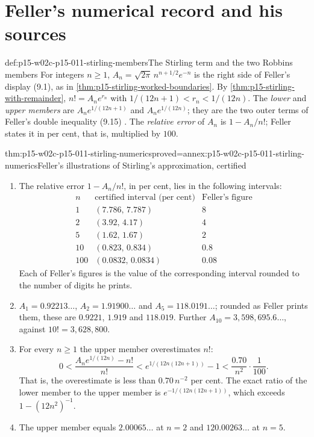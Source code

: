 \section{Feller's numerical record and his sources}
\label{sec:p15-w02c-p15-011-feller-record}

\begin{hbconvention}{def:p15-w02c-p15-011-stirling-members}{The Stirling term and the two Robbins members}
For integers \(n\geq1\), \(A_n=\sqrt{2\pi}\,n^{n+1/2}e^{-n}\) is the right
side of Feller's display (9.1), as in
\cref{thm:p15-stirling-worked-boundaries}. By
\cref{thm:p15-stirling-with-remainder}, \(n!=A_ne^{r_n}\) with
\(1/(12n+1)<r_n<1/(12n)\). The \emph{lower} and \emph{upper members} are
\(A_ne^{1/(12n+1)}\) and \(A_ne^{1/(12n)}\); they are the two outer terms of
Feller's double inequality (9.15)
\cite[p.~54]{Feller1968ProbabilityI}. The \emph{relative error} of \(A_n\) is
\(1-A_n/n!\); Feller states it in per cent, that is, multiplied by \(100\).
\end{hbconvention}

\begin{hbtheorem}{thm:p15-w02c-p15-011-stirling-numerics}{proved=annex:p15-w02c-p15-011-stirling-numerics}{Feller's illustrations of Stirling's approximation, certified}
\begin{enumerate}
\item The relative error \(1-A_n/n!\), in per cent, lies in the following
      intervals:
      \[
       \begin{array}{c|c|c}
        n & \text{certified interval (per cent)} & \text{Feller's figure}\\\hline
        1 & (7.786,\,7.787) & 8\\
        2 & (3.92,\,4.17) & 4\\
        5 & (1.62,\,1.67) & 2\\
        10 & (0.823,\,0.834) & 0.8\\
        100 & (0.0832,\,0.0834) & 0.08
       \end{array}
      \]
      Each of Feller's figures is the value of the corresponding interval
      rounded to the number of digits he prints.
\item \(A_1=0.92213\ldots\), \(A_2=1.91900\ldots\) and
      \(A_5=118.0191\ldots\); rounded as Feller prints them, these are
      \(0.9221\), \(1.919\) and \(118.019\). Further
      \(A_{10}=3{,}598{,}695.6\ldots\), against \(10!=3{,}628{,}800\).
\item For every \(n\geq1\) the upper member overestimates \(n!\):
      \[
       0<\frac{A_ne^{1/(12n)}-n!}{n!}
         <e^{1/(12n(12n+1))}-1
         <\frac{0.70}{n^2}\cdot\frac1{100}.
      \]
      That is, the overestimate is less than \(0.70\,n^{-2}\) per cent.
      The exact ratio of the lower member to the upper member is
      \(e^{-1/(12n(12n+1))}\), which exceeds \(1-(12n^2)^{-1}\).
\item The upper member equals \(2.00065\ldots\) at \(n=2\) and
      \(120.00263\ldots\) at \(n=5\).
\end{enumerate}
\end{hbtheorem}

